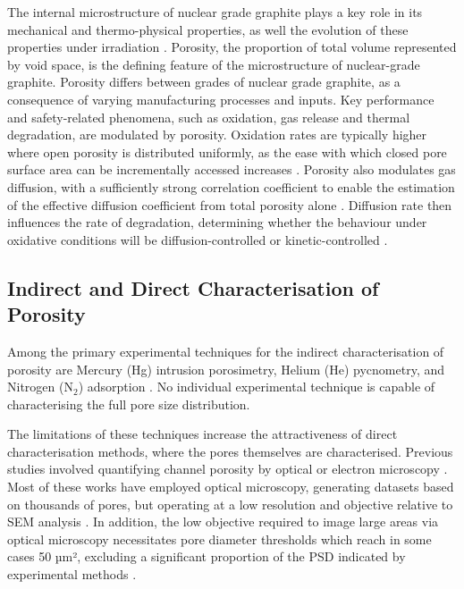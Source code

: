 \documentclass[review]{elsarticle}
\begin{document}
The internal microstructure of nuclear grade graphite plays a key role in its
mechanical and thermo-physical properties, as well the evolution of these
properties under irradiation \citep{MARSDENgeniv}. Porosity, the proportion of
total volume represented by void space,  is the defining feature of the
microstructure of nuclear-grade graphite.  Porosity differs between grades of
nuclear grade graphite, as a consequence of varying manufacturing processes and
inputs\citep{ARREGUIMENA2022112047}. Key performance and safety-related
phenomena, such as oxidation, gas release and thermal degradation, are modulated
by porosity. Oxidation rates are typically higher where open porosity is
distributed uniformly, as the ease with which closed pore surface area can be
incrementally accessed increases \citep{PAUL2022132}. Porosity also modulates
gas diffusion, with a sufficiently strong correlation coefficient to enable the
estimation of the effective diffusion coefficient from total porosity alone
\citep{KANE2018369}. Diffusion rate then influences the rate of degradation,
determining whether the behaviour under oxidative conditions will be
diffusion-controlled or kinetic-controlled \citep{MATTHEWS2021111245}. 

\subsection{Indirect and Direct Characterisation of Porosity}

Among the primary experimental techniques for the indirect characterisation of
porosity are Mercury (Hg) intrusion porosimetry, Helium (He) pycnometry, and
Nitrogen (N$_2$) adsorption \citep{ARREGUIMENA2022112047, JONES2020256HgHe,
CONTESCU2019663}. No individual experimental technique is capable of
characterising the full pore size distribution. 

The limitations  of these techniques increase the attractiveness of direct
characterisation methods, where the pores themselves are characterised. Previous
studies involved quantifying channel porosity  by optical or electron microscopy
\citep{Huang2014, Huang2019, Kane2011a, Kim2010,
Taylor2016,huang2021statistical, ARREGUIMENA2022112047}. Most of these works
have employed optical microscopy, generating datasets based on thousands of
pores, but operating at a low resolution and objective relative to SEM analysis
\citep{Huang2019, Kane2011a, Taylor2016}. In addition, the low objective
required to image large areas via optical microscopy necessitates pore diameter
thresholds which reach in some cases 50 µm², excluding a significant proportion
of the PSD indicated by experimental methods \citep{Huang2019, Kane2011a,
Taylor2016}. 
\end{document}
